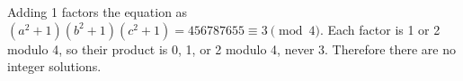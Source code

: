 Adding 1 factors the equation as $(a^2+1)(b^2+1)(c^2+1)=456787655\equiv3\pmod4$. Each factor is 1 or 2 modulo 4, so their product is 0, 1, or 2 modulo 4, never 3. Therefore there are no integer solutions.
